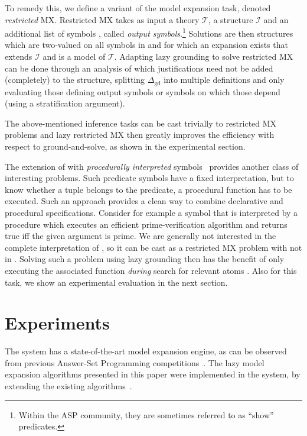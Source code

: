 \documentclass[11pt]{article}
\newcommand{\m}[1]{\ensuremath{#1}\xspace}
\newcommand{\I}{\m{\mathcal{I}}}
\newcommand{\theory}{\m{\mathcal{T}}}
\newcommand{\D}{\m{\Delta}}
\newcommand{\logicname}[1]{\text{\sc #1}\xspace}
\newcommand{\idp}{\logicname{IDP}}
\newcommand{\foid}{\logicname{FO(\ensuremath{ID})}}
\theoremstyle{plain}
\theoremstyle{definition}
\theoremstyle{example_basic}
\theoremstyle{example_contd}
\theoremstyle{plain}
\newcommand{\Dgd}{\ensuremath{\D_\text{gd}}\xspace}
\begin{document}
To remedy this, we define a variant of the model expansion task, denoted \emph{restricted} MX. Restricted MX takes as input a theory \theory, a structure \I and an additional list of symbols , called \emph{output symbols}.\footnote{Within the ASP community, they are sometimes referred to as ``show'' predicates.} Solutions are then structures  which are two-valued on all symbols in  and for which an expansion exists that extends \I and is a model of \theory. Adapting lazy grounding to solve restricted MX can be done through an analysis of which justifications need not be added (completely) to the structure, splitting \Dgd into multiple definitions and only evaluating those defining output symbols or symbols on which those depend (using a stratification argument).

The above-mentioned inference tasks can be cast trivially to restricted MX problems and lazy restricted MX then greatly improves the efficiency with respect to ground-and-solve, as shown in the experimental section.

The extension of \foid with \emph{procedurally interpreted} symbols~\cite{WarrenBook/DeCatBBD14} provides another class of interesting problems. Such predicate symbols have a fixed interpretation, but to know whether a tuple belongs to the predicate, a procedural function has to be executed.  Such an approach provides a clean way to combine declarative and procedural specifications. Consider for example a symbol  that is interpreted by a procedure which executes an efficient prime-verification algorithm and returns true iff the given argument is prime. We are generally not interested in the complete interpretation of , so it can be cast as a restricted MX problem with  not in .  Solving such a problem using lazy grounding then has the benefit of only executing the associated function \emph{during} search for relevant atoms . Also for this task, we show an experimental evaluation in the next section.

\newcommand{\tout}{\texttt{T}}

\newcommand{\mout}{\texttt{M}}
\newcommand{\gs}{\texttt{g\&s}}

\section{Experiments}\label{sec:experiments}
The \idp system has a state-of-the-art model expansion engine, as can
be observed from previous Answer-Set Programming competitions~. The lazy model expansion algorithms presented in this paper were implemented in the \idp system, by extending the existing algorithms~\cite{ictai/DeCat13}.
\end{document}
